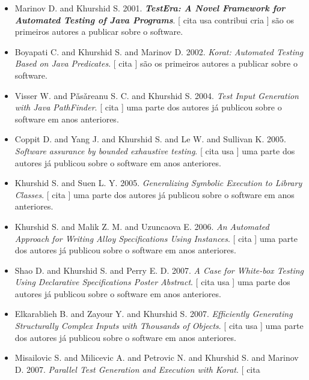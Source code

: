 \begin{itemize}
\item Marinov D. and Khurshid S.
      2001.
        \textbf{\textit{ TestEra: A Novel Framework for Automated Testing of Java Programs}}.
      [
          cita
          usa
          contribui
          cria
      ]
são os primeiros autores a publicar sobre o software.
\item Boyapati C. and Khurshid S. and Marinov D.
      2002.
        \textit{ Korat: Automated Testing Based on Java Predicates}.
      [
          cita
      ]
são os primeiros autores a publicar sobre o software.
\item Visser W. and P\v{a}s\v{a}reanu S. C. and Khurshid S.
      2004.
        \textit{ Test Input Generation with Java PathFinder}.
      [
          cita
      ]
uma parte dos autores já publicou sobre o software em anos anteriores.
\item Coppit D. and Yang J. and Khurshid S. and Le W. and Sullivan K.
      2005.
        \textit{ Software assurance by bounded exhaustive testing}.
      [
          cita
          usa
      ]
uma parte dos autores já publicou sobre o software em anos anteriores.
\item Khurshid S. and Suen L. Y.
      2005.
        \textit{ Generalizing Symbolic Execution to Library Classes}.
      [
          cita
      ]
uma parte dos autores já publicou sobre o software em anos anteriores.
\item Khurshid S. and Malik Z. M. and Uzuncaova E.
      2006.
        \textit{ An Automated Approach for Writing Alloy Specifications Using Instances}.
      [
          cita
      ]
uma parte dos autores já publicou sobre o software em anos anteriores.
\item Shao D. and Khurshid S. and Perry E. D.
      2007.
        \textit{ A Case for White-box Testing Using Declarative Specifications Poster Abstract}.
      [
          cita
          usa
      ]
uma parte dos autores já publicou sobre o software em anos anteriores.
\item Elkarablieh B. and Zayour Y. and Khurshid S.
      2007.
        \textit{ Efficiently Generating Structurally Complex Inputs with Thousands of Objects}.
      [
          cita
          usa
      ]
uma parte dos autores já publicou sobre o software em anos anteriores.
\item Misailovic S. and Milicevic A. and Petrovic N. and Khurshid S. and Marinov D.
      2007.
        \textit{ Parallel Test Generation and Execution with Korat}.
      [
          cita

\end{itemize}
